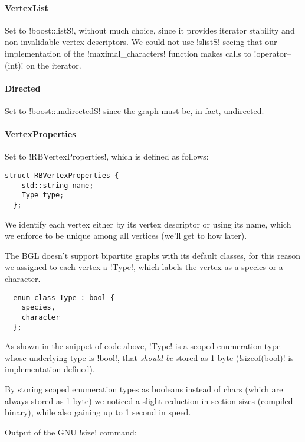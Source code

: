 \paragraph{VertexList}

Set to !boost::listS!, without much choice, since it provides iterator stability and non invalidable vertex descriptors.
We could not use !slistS! seeing that our implementation of the !maximal_characters! function makes calls to !operator--(int)! on the iterator.

\paragraph{Directed}

Set to !boost::undirectedS! since the graph must be, in fact, undirected.

\paragraph{VertexProperties}

Set to !RBVertexProperties!, which is defined as follows:

\begin{lstlisting}[moreemph={Type}]
  struct RBVertexProperties {
    std::string name;
    Type type;
  };
\end{lstlisting}

We identify each vertex either by its vertex descriptor or using its name, which we enforce to be unique among all vertices (we'll get to how later).

The BGL doesn't support bipartite graphs with its default classes, for this reason we assigned to each vertex a !Type!, which labels the vertex as a species or a character.

\begin{lstlisting}
  enum class Type : bool {
    species,
    character
  };
\end{lstlisting}

As shown in the snippet of code above, !Type! is a scoped enumeration type whose underlying type is !bool!, that \emph{should be} stored as 1 byte (!sizeof(bool)! is implementation-defined).

By storing scoped enumeration types as booleans instead of chars (which are always stored as 1 byte) we noticed a slight reduction in section sizes (compiled binary), while also gaining up to 1 second in speed.

Output of the GNU !size! command:


